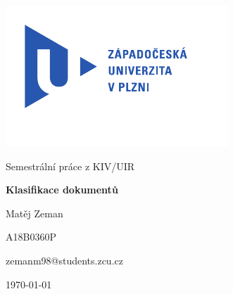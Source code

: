 \documentclass[
12pt,
a4paper,
pdftex,
czech,
titlepage
]{report}
\begin{document}
\begin{titlepage}
	\vspace*{-2cm}
	{\centering\includegraphics[scale=1.0]{logo.pdf}\par}
	\centering
	\vspace*{2cm}
	{\Large Semestrální práce z KIV/UIR\par}
	\vspace{1.5cm}
	{\Huge\bfseries Klasifikace dokumentů\par}
	\vspace{2cm}

	{\Large Matěj Zeman\par}
	{\Large A18B0360P\par}
	{\Large zemanm98@students.zcu.cz\par}

	\vfill

	{\Large \today }
\end{titlepage}

\tableofcontents
\thispagestyle{empty}
\clearpage
\end{document}
